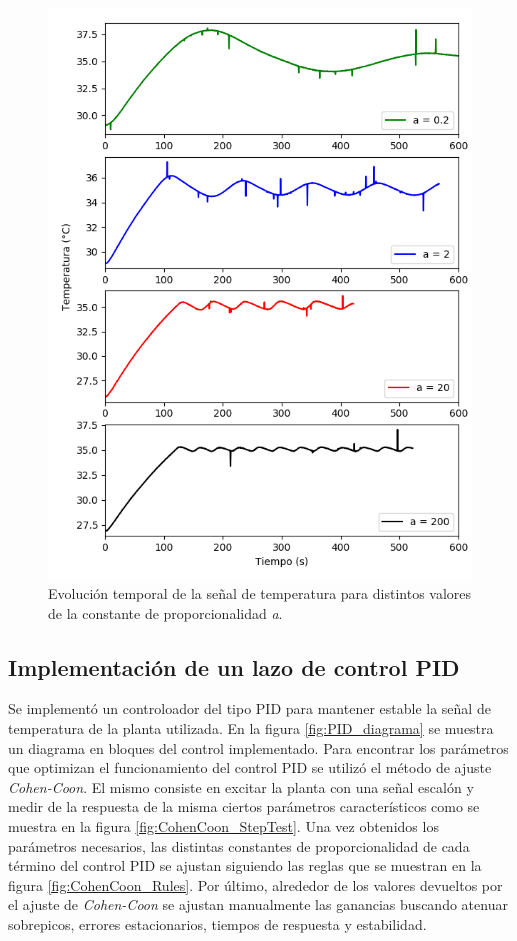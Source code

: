 \documentclass[a4paper,11pt]{article}
\begin{document}
\begin{figure}[!h]
\centering
\includegraphics[width=\textwidth]{figs/lazo_temp}
\caption{Evolución temporal de la señal de temperatura para distintos
valores de la constante de proporcionalidad \emph{a}.}
\label{fig:lazo_temp}
\end{figure}

\clearpage
\subsection{Implementación de un lazo de control PID}

Se implementó un controloador del tipo PID para mantener estable la
señal de temperatura de la planta utilizada. En la figura
\ref{fig:PID_diagrama} se muestra un diagrama en bloques del control
implementado. Para encontrar los parámetros que optimizan el
funcionamiento del control PID se utilizó el método de ajuste
\emph{Cohen-Coon}. El mismo consiste en excitar la planta con una señal
escalón y medir de la respuesta de la misma ciertos parámetros
característicos como se muestra en la figura
\ref{fig:CohenCoon_StepTest}. Una vez obtenidos los parámetros
necesarios, las distintas constantes de proporcionalidad de cada término
del control PID se ajustan siguiendo las reglas que se muestran en la
figura \ref{fig:CohenCoon_Rules}. Por último, alrededor de los valores devueltos por el ajuste de \emph{Cohen-Coon} se ajustan manualmente las ganancias buscando atenuar sobrepicos, errores estacionarios, tiempos de respuesta y estabilidad.
\end{document}
